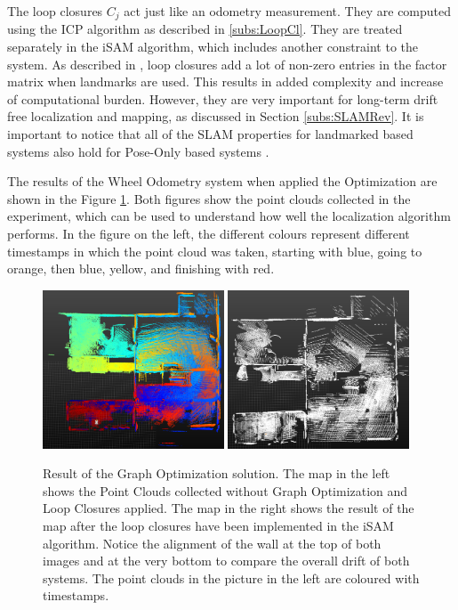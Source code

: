 \documentclass[12pt]{article}
\begin{document}
The loop closures $C_j$ act just like an odometry measurement. They are computed using the ICP algorithm as described in \ref{subs:LoopCl}. They are treated separately in the iSAM algorithm, which includes another constraint to the system. As described in \cite{Kaess08tro}, loop closures add a lot of non-zero entries in the factor matrix when landmarks are used. This results in added complexity and increase of computational burden. However, they are very important for long-term drift free localization and mapping, as discussed in Section \ref{subs:SLAMRev}. It is important to notice that all of the SLAM properties for landmarked based systems also hold for Pose-Only based systems \cite{Kaess08tro}.
	
The results of the Wheel Odometry system when applied the Optimization are shown in the Figure \ref{fig:GraphOptimization1}. Both figures show the  point clouds collected in the experiment, which can be used to understand how well the localization algorithm performs. In the figure on the left, the different colours represent different timestamps in which the point cloud was taken, starting with blue, going to orange, then blue, yellow, and finishing with red.
	
\begin{figure}[ht]
\centering
\includegraphics[width=0.48\textwidth]{ResultNoLoopClosure}
\includegraphics[width=0.48\textwidth]{ResultLoopClosure}
\caption{Result of the Graph Optimization solution. The map in the left shows the Point Clouds collected without Graph Optimization and Loop Closures applied. The map in the right shows the result of the map after the loop closures have been implemented in the iSAM algorithm. Notice the alignment of the wall at the top of both images and at the very bottom to compare the overall drift of both systems. The point clouds in the picture in the left are coloured with timestamps.}
\label{fig:GraphOptimization1}	
\end{figure}
	
\end{document}
